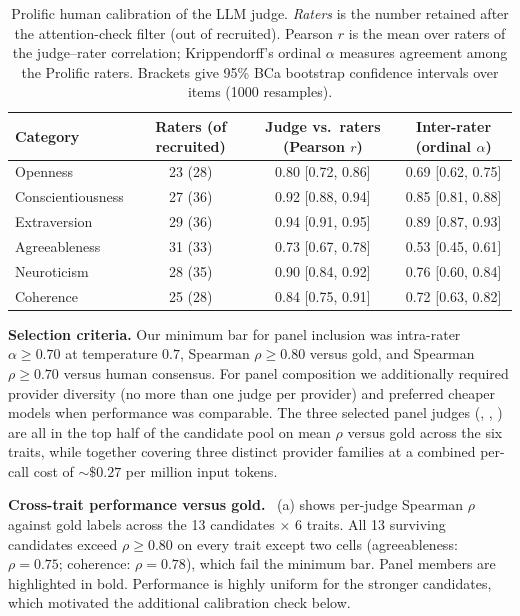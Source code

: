 \begin{table}[!htbp]
\centering
\caption{Prolific human calibration of the LLM judge. \emph{Raters} is the number retained after the attention-check filter (out of recruited). Pearson $r$ is the mean over raters of the judge--rater correlation; Krippendorff's ordinal $\alpha$ measures agreement among the Prolific raters. Brackets give 95\% BCa bootstrap confidence intervals over items (1000 resamples).}
\label{tab:prolific-calibration}
\vspace{0.5em}
\small
\begin{tabular}{lccc}
\toprule
Category & Raters (of recruited) & Judge vs.\ raters (Pearson $r$) & Inter-rater (ordinal $\alpha$) \\
\midrule
Openness          & 23 (28) & 0.80 [0.72, 0.86] & 0.69 [0.62, 0.75] \\
Conscientiousness & 27 (36) & 0.92 [0.88, 0.94] & 0.85 [0.81, 0.88] \\
Extraversion      & 29 (36) & 0.94 [0.91, 0.95] & 0.89 [0.87, 0.93] \\
Agreeableness     & 31 (33) & 0.73 [0.67, 0.78] & 0.53 [0.45, 0.61] \\
Neuroticism       & 28 (35) & 0.90 [0.84, 0.92] & 0.76 [0.60, 0.84] \\
Coherence         & 25 (28) & 0.84 [0.75, 0.91] & 0.72 [0.63, 0.82] \\
\bottomrule
\end{tabular}
\end{table}

\textbf{Selection criteria.}
Our minimum bar for panel inclusion was intra-rater $\alpha \geq 0.70$ at temperature $0.7$, Spearman $\rho \geq 0.80$ versus gold, and Spearman $\rho \geq 0.70$ versus human consensus. For panel composition we additionally required provider diversity (no more than one judge per provider) and preferred cheaper models when performance was comparable. The three selected panel judges (\QwenThreeSizeTwoThreeFiveB, \GemmaFourSizeTwentySixB, \LlamaThreePointThreeSizeSeventyBInstruct) are all in the top half of the candidate pool on mean $\rho$ versus gold across the six traits, while together covering three distinct provider families at a combined per-call cost of $\sim\$0.27$ per million input tokens.

\textbf{Cross-trait performance versus gold.}
~(a) shows per-judge Spearman $\rho$ against gold labels across the 13 candidates $\times$ 6 traits. All 13 surviving candidates exceed $\rho \geq 0.80$ on every trait except two \GPTFourPointOneNano cells (agreeableness: $\rho = 0.75$; coherence: $\rho = 0.78$), which fail the minimum bar. Panel members are highlighted in bold. Performance is highly uniform for the stronger candidates, which motivated the additional calibration check below.


